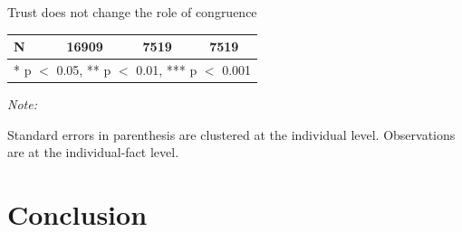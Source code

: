 \documentclass[10pt]{beamer}
\begin{document}
\begin{frame}{Trust does not change the role of congruence}
{\begin{adjustbox}{width=\textwidth, totalheight=\textheight-\baselineskip,keepaspectratio}
\begin{threeparttable}
\begin{tabular}[t]{lccc}
\midrule
\hspace{1em}N & 16909 & 7519 & 7519\\
\bottomrule
\multicolumn{4}{l}{\rule{0pt}{1em}* p $<$ 0.05, ** p $<$ 0.01, *** p $<$ 0.001}\\
\end{tabular}
\begin{tablenotes}[para]
\item \textit{Note: } 
\item Standard errors in parenthesis are clustered at the individual level.
      Observations are at the individual-fact level. 
\end{tablenotes}
\end{threeparttable}
\end{adjustbox}
}
\end{frame}




\section{Conclusion}
\end{document}
